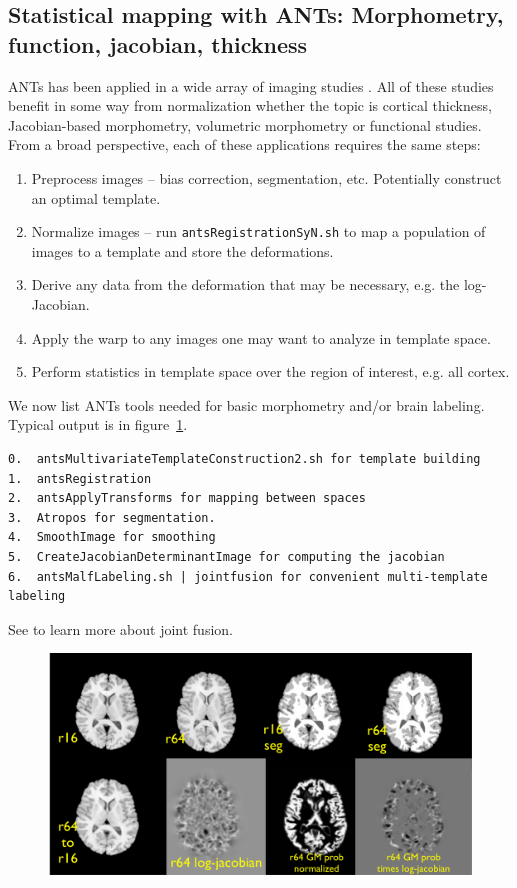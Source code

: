 \documentclass{InsightArticle}
\begin{document}
\subsection{Statistical mapping with ANTs: Morphometry, function, jacobian, thickness}
ANTs has been applied in a wide array of imaging studies
\cite{Avants2009a,Avants2009b,Avants2009,Das2009,Klein2009,Massimo2009,Pluta2008,Tustison2009,Yushkevich2009,Avants2008c,Avants2008b,M.Grossman10282008,Kim2008,Simon2008,Sun2008,Yushkevich2008,Aguirre2007,Avants2007,Avants2007i}.
All of these studies benefit in some way from normalization whether the topic is cortical
thickness, Jacobian-based morphometry, volumetric morphometry or functional studies. 
From a broad perspective, each of these applications requires the same steps:
\begin{enumerate}
\item Preprocess images -- bias correction, segmentation, etc.  Potentially construct an optimal template. 
\item Normalize images -- run \texttt{antsRegistrationSyN.sh} to map a population of images to a template and store the deformations. 
\item Derive any data from the deformation that may be necessary, e.g. the log-Jacobian.
\item Apply the warp to any images one may want to analyze in template space.  
\item Perform statistics in template space over the region of interest, e.g. all cortex. 
\end{enumerate}
We now list ANTs tools needed for basic morphometry and/or brain labeling.
Typical output is in figure~\ref{fig:morph}.
\begin{verbatim}
0.  antsMultivariateTemplateConstruction2.sh for template building
1.  antsRegistration
2.  antsApplyTransforms for mapping between spaces
3.  Atropos for segmentation.
4.  SmoothImage for smoothing  
5.  CreateJacobianDeterminantImage for computing the jacobian
6.  antsMalfLabeling.sh | jointfusion for convenient multi-template labeling
\end{verbatim}
See \cite{Wang2011} to learn more about joint fusion.
\begin{figure}
\includegraphics[width=1\textwidth]{Figures/morphometry.pdf}
\label{fig:morph}
\end{figure}
\end{document}
